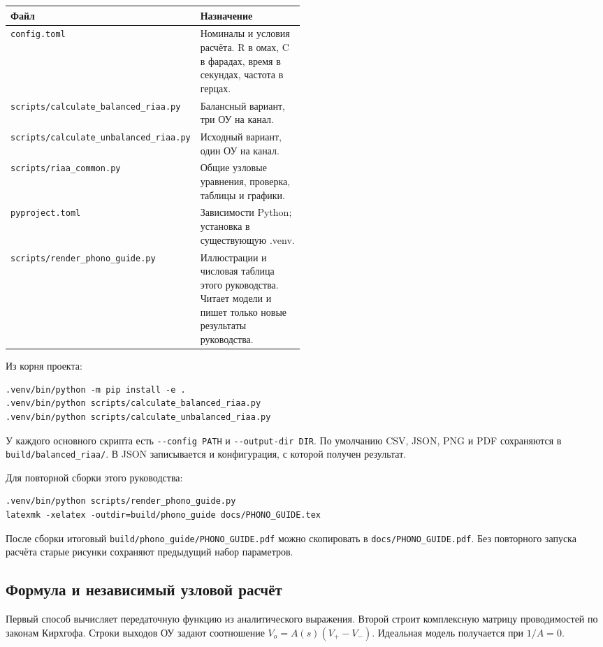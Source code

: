 \documentclass[a4paper,11pt]{article}
\newcommand{\file}[1]{\nolinkurl{#1}}
\begin{document}
\begin{tabularx}{\linewidth}{@{}L{0.49\linewidth}Y@{}}
\toprule
Файл & Назначение\\
\midrule
\file{config.toml} & Номиналы и условия расчёта. R в омах, C в фарадах,
время в секундах, частота в герцах.\\
\file{scripts/calculate_balanced_riaa.py} & Балансный вариант, три ОУ на канал.\\
\file{scripts/calculate_unbalanced_riaa.py} & Исходный вариант, один ОУ на канал.\\
\file{scripts/riaa_common.py} & Общие узловые уравнения, проверка,
таблицы и графики.\\
\file{pyproject.toml} & Зависимости Python; установка в существующую .venv.\\
\file{scripts/render_phono_guide.py} & Иллюстрации и числовая таблица этого
руководства. Читает модели и пишет только новые результаты руководства.\\
\bottomrule
\end{tabularx}

Из корня проекта:
\begin{verbatim}
.venv/bin/python -m pip install -e .
.venv/bin/python scripts/calculate_balanced_riaa.py
.venv/bin/python scripts/calculate_unbalanced_riaa.py
\end{verbatim}
У каждого основного скрипта есть \file{--config PATH} и \file{--output-dir DIR}.
По умолчанию CSV, JSON, PNG и PDF сохраняются в \file{build/balanced_riaa/}.
В JSON записывается и конфигурация, с которой получен результат.

Для повторной сборки этого руководства:
\begin{verbatim}
.venv/bin/python scripts/render_phono_guide.py
latexmk -xelatex -outdir=build/phono_guide docs/PHONO_GUIDE.tex
\end{verbatim}
После сборки итоговый \file{build/phono_guide/PHONO_GUIDE.pdf} можно
скопировать в \file{docs/PHONO_GUIDE.pdf}. Без повторного запуска расчёта
старые рисунки сохраняют предыдущий набор параметров.

\subsection{Формула и независимый узловой расчёт}

Первый способ вычисляет передаточную функцию из аналитического выражения.
Второй строит комплексную матрицу проводимостей по законам Кирхгофа.
Строки выходов ОУ задают соотношение $V_o=A(s)(V_+-V_-)$.
Идеальная модель получается при $1/A=0$.
\end{document}
